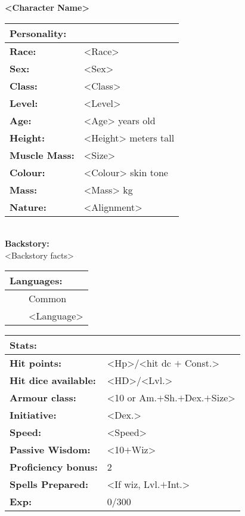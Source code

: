 \documentclass[11pt]{article}
\newcommand{\tabitem}{~~\llap{--}~~}
\begin{document}
	\begin{center}
\Huge \textbf{<Character Name>}
	\end{center}
	\begin{multicols}{2}
\noindent \begin{tabularx}{95mm}{@{}l l}
\Large \textbf{Personality:} 	& 						\\
\hline
\textbf{Race:} 					& <Race>	 			\\
\textbf{Sex:} 					& <Sex> 				\\
\textbf{Class:}					& <Class>				\\
\textbf{Level:} 				& <Level>				\\
\textbf{Age:} 					& <Age> years old		\\
\textbf{Height:} 				& <Height> meters tall 	\\
\textbf{Muscle Mass:} 			& <Size> 				\\
\textbf{Colour:} 				& <Colour> skin tone 	\\
\textbf{Mass:} 					& <Mass> kg		 		\\
\textbf{Nature:} 				& <Alignment>
		\end{tabularx} \\
\textbf{Backstory:} \\
<Backstory facts>

\noindent \begin{tabularx}{95mm}{@{}l}
{\Large \textbf{Languages:}} \\
\hline
\tabitem Common \\
\tabitem <Language>
		\end{tabularx}

\vspace{4mm}

\noindent \begin{tabularx}{95mm}{@{}l l}
\Large \textbf{Stats:}		 	& 									\\
\hline
\textbf{Hit points:} 			& <Hp>/<hit dc $+$ Const.> 			\\
\textbf{Hit dice available:}	& <HD>/<Lvl.>						\\
\textbf{Armour class:} 			& <10 or Am.$+$Sh.$+$Dex.$+$Size> 	\\
\textbf{Initiative:} 			& <Dex.>							\\
\textbf{Speed:} 				& <Speed>	 						\\
\textbf{Passive Wisdom:} 		& <10$+$Wiz>	 					\\
\textbf{Proficiency bonus:}		& 2									\\
\textbf{Spells Prepared:} 		& <If wiz, Lvl.$+$Int.>				\\
\textbf{Exp:} 					& 0/300
		\end{tabularx}


\end{multicols}
\end{document}
